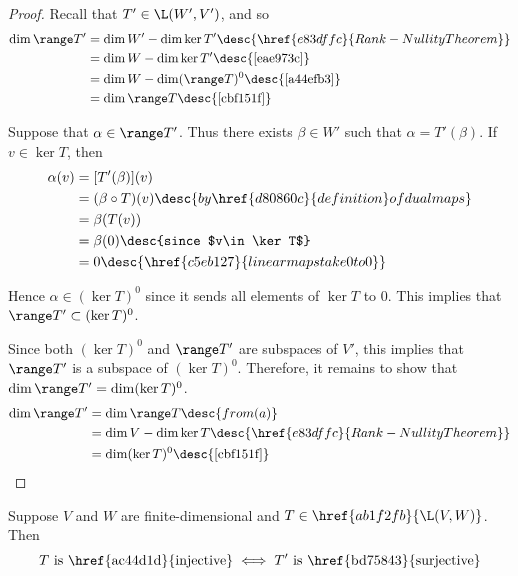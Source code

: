 \begin{proof}
   Recall that $T'\in\L(W',V')$, and so
  \begin{align*}
    \dim\range T' &=\dim W'-\dim\ker T'\desc{\href{e83dffc}{Rank-Nullity Theorem}} \\
                  &=\dim W-\dim\ker T'\desc{\autoref{eae973c}}                     \\
                  &=\dim W-\dim(\range T)^0\desc{\autoref{a44efb3}}                \\
                  &=\dim\range T\desc{\autoref{cbf151f}}
  \end{align*}

   Suppose that $\alpha\in\range T'$. Thus there exists $\beta\in
  W'$ such that $\alpha=T'(\beta)$. If $v\in\ker T$, then
  \begin{align*}
    \alpha(v) &=[T'(\beta)](v)                                                     \\
              &=(\beta\circ T)(v)\desc{by \href{d80860c}{definition} of dual maps} \\
              &=\beta(T(v))                                                        \\
              &=\beta(0)\desc{since $v\in\ker T$}                                  \\
              &=0\desc{\href{c5eb127}{linear maps take 0 to 0}}
  \end{align*}

  Hence $\alpha\in(\ker T)^0$ since it sends all elements of $\ker T$ to 0.
  This implies that $\range T'\subset(\ker T)^0$.

  Since both \href{b53cbdf}{$(\ker T)^0$} and \href{d0afc28}{$\range T'$} are
  subspaces of $V'$, this implies that $\range T'$ is a subspace of $(\ker
  T)^0$. Therefore, it remains to show that $\dim\range T'=\dim(\ker T)^0$.
  \begin{align*}
    \dim\range T' &=\dim\range T\desc{from (a)}                                  \\
                  &=\dim V-\dim\ker T\desc{\href{e83dffc}{Rank-Nullity Theorem}} \\
                  &=\dim(\ker T)^0\desc{\autoref{cbf151f}}
  \end{align*}
\end{proof}

\label{f15b5a8}

Suppose $V$ and $W$ are finite-dimensional and $T\in\href{ab1f2fb}{\L(V,W)}$.
Then
$$
  T\text{ is \href{ac44d1d}{injective}}\iff T'\text{ is \href{bd75843}{surjective}}
$$

